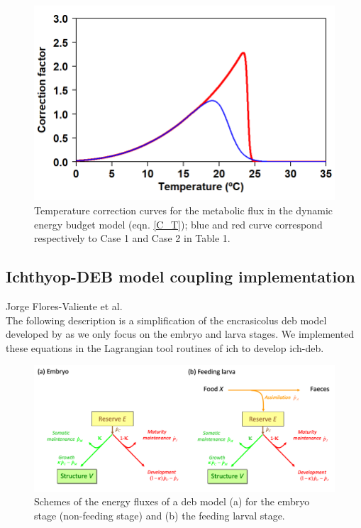 \begin{figure}[ht]
	\includegraphics[width=1.0\textwidth]{figures/Chap3CT_curves.png}
	\centering
	\caption{Temperature correction curves for the metabolic flux in the dynamic energy budget model (eqn. \ref{C_T}); blue and red curve correspond respectively to Case 1 and Case 2 in Table 1.}
	\label{Chap3CT_curves}
\end{figure}

\subsection{Ichthyop-DEB model coupling implementation}\label{Chap3Ich-DEBstd}

Jorge Flores-Valiente et al.\\

The following description is a simplification of the \gls{encrasicolus} \acrshort{deb} model developed by \cite{PethRoos2013} as we only focus on the embryo and larva stages. We implemented these equations in the Lagrangian tool routines of \gls{ich} \citep{LettVerl2008} to develop \gls{ich-deb}.\\

\begin{figure}[ht]
	\includegraphics[width=1.0\textwidth]{figures/Chap3DEBflux.png}
	\centering
	\caption{Schemes of the energy fluxes of a \acrlong{deb} model (a) for the embryo stage (non-feeding stage) and (b) the feeding larval stage.}
	\label{Chap3DEBflux}
\end{figure}

